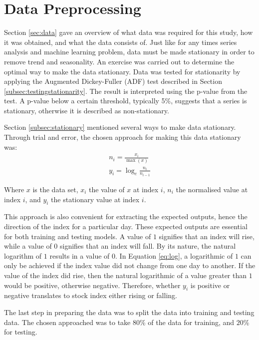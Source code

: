 \documentclass{UoYCSproject}
\begin{document}
\section{Data Preprocessing}
\label{sec:datapreprocessing}
Section \ref{sec:data} gave an overview of what data was required for this study, how it was obtained, and what the data consists of. Just like for any times series analysis and machine learning problem, data must be made stationary in order to remove trend and seasonality. An exercise was carried out to determine the optimal way to make the data stationary. Data was tested for stationarity by applying the Augmented Dickey-Fuller (ADF) test described in Section \ref{subsec:testingstationarity}. The result is interpreted using the p-value from the test. A p-value below a certain threshold, typically 5\%, suggests that a series is stationary, otherwise it is described as non-stationary. 

Section \ref{subsec:stationary} mentioned several ways to make data stationary. Through trial and error, the chosen approach for making this data stationary was:
\begin{align}
n_i = \frac{x_i}{\max(x)} \label{eq:normalised} \\ 
y_i = \log_e\frac{n_i}{n_{i-1}} \label{eq:log} 
\end{align}

Where $x$ is the data set, $x_i$ the value of $x$ at index $i$, $n_i$ the normalised value at index $i$, and $y_i$ the stationary value at index $i$. 

This approach is also convenient for extracting the expected outputs, hence the direction of the index for a particular day. These expected outputs are essential for both training and testing models. A value of $1$ signifies that an index will rise, while a value of $0$ signifies that an index will fall. By its nature, the natural logarithm of $1$ results in a value of 0. In Equation \ref{eq:log}, a logarithmic of $1$ can only be achieved if the index value did not change from one day to another. If the value of the index did rise, then the natural logarithmic of a value greater than $1$ would be positive, otherwise negative. Therefore, whether $y_i$ is positive or negative translates to stock index either rising or falling.

The last step in preparing the data was to split the data into training and testing data. The chosen approached was to take $80$\% of the data for training, and $20$\% for testing.
\end{document}
